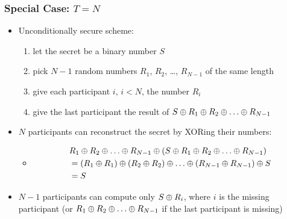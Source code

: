 \documentclass[final]{article}
\begin{document}
\subsubsection*{Special Case: $T = N$}
\begin{itemize}[nosep]
    \item Unconditionally secure scheme:
          \begin{enumerate}[nosep]
              \item let the secret be a binary number $S$
              \item pick $N - 1$ random numbers $R_1$, $R_2$, \dots, $R_{N-1}$ of the same length
              \item give each participant $i$, $i < N$, the number $R_i$
              \item give the last participant the result of $S \xor R_1 \xor R_2 \xor \dots \xor R_{N-1}$
          \end{enumerate}
    \item $N$ participants can reconstruct the secret by XORing their numbers:
          \begin{itemize}[nosep]
              \item \begin{align*}&R_1 \xor R_2 \xor \dots \xor R_{N-1} \xor \left(S \xor R_1 \xor R_2 \xor \dots \xor R_{N-1}\right) \\&= (R_1 \xor R_1) \xor (R_2 \xor R_2) \xor \dots \xor (R_{N-1} \xor R_{N-1}) \xor S \\&= S\end{align*}
          \end{itemize}
    \item $N - 1$ participants can compute only $S \oplus R_i$, where $i$ is the missing participant (or $R_1 \xor R_2 \xor \dots \xor R_{N-1}$ if the last participant is missing)
\end{itemize}
\end{document}
